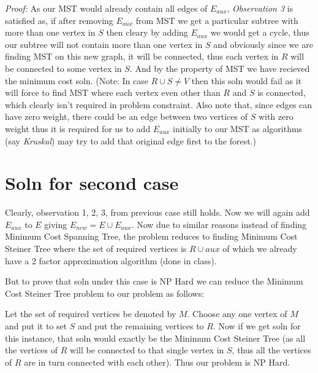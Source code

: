 \documentclass[12pt,3p]{elsarticle}
\begin{document}
\textit{Proof: }As our MST would already contain all edges of $E_{aux}$, \textit{Observation 3} is satisfied as, if after removing $E_{aux}$ from MST we get a particular subtree with more than one vertex in $S$ then cleary by adding $E_{aux}$ we would get a cycle, thus our subtree will not contain more than one vertex in $S$ and obviously since we are finding MST on this new graph, it will be connected, thus each vertex in $R$ will be connected to some vertex in $S$. And by the property of MST we have recieved the minimum cost soln. (Note: In case $R \cup S \neq V$ then this soln would fail as it will force to find MST where each vertex even other than $R$ and $S$ is connected, which clearly isn't required in problem constraint. Also note that, since edges can have zero weight, there could be an edge between two vertices of $S$ with zero weight thus it is required for us to add $E_{aux}$ initially to our MST as algorithms (say \textit{Kruskal}) may try to add that original edge first to the forest.)

\section{Soln for second case}
Clearly, observation 1, 2, 3, from previous case still holds. Now we will again add $E_{aux}$ to $E$ giving $E_{new} = E \cup E_{aux}$. Now due to similar reasons instead of finding Minimum Cost Spanning Tree, the problem reduces to finding Minimum Cost Steiner Tree where the set of required vertices is $R \cup aux$ of which we already have a 2 factor approximation algorithm (done in class). 

But to prove that soln under this case is NP Hard we can reduce the Minimum Cost Steiner Tree problem to our problem as follows:

Let the set of required vertices be denoted by $M$. Choose any one vertex of $M$ and put it to set $S$ and put the remaining vertices to $R$. Now if we get soln for this instance, that soln would exactly be the Minimum Cost Steiner Tree (as all the vertices of $R$ will be connected to that single vertex in $S$, thus all the vertices of $R$ are in turn connected with each other). Thus our problem is NP Hard.
\end{document}
